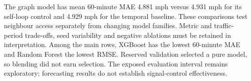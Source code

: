 The graph model has mean 60-minute MAE 4.881 mph versus 4.931 mph for its self-loop control and 4.929 mph for the temporal baseline. These comparisons test neighbour access separately from changing model families. Metric and traffic-period trade-offs, seed variability and negative ablations must be retained in interpretation. Among the main rows, XGBoost has the lowest 60-minute MAE and Random Forest the lowest RMSE. Reserved validation selected a pure model, so blending did not earn selection. The exposed evaluation interval remains exploratory; forecasting results do not establish signal-control effectiveness.
